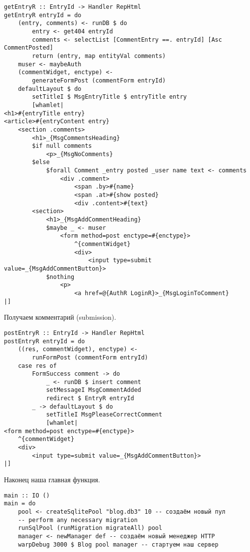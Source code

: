 \begin{lstlisting}
getEntryR :: EntryId -> Handler RepHtml
getEntryR entryId = do
    (entry, comments) <- runDB $ do
        entry <- get404 entryId
        comments <- selectList [CommentEntry ==. entryId] [Asc CommentPosted]
        return (entry, map entityVal comments)
    muser <- maybeAuth
    (commentWidget, enctype) <-
        generateFormPost (commentForm entryId)
    defaultLayout $ do
        setTitleI $ MsgEntryTitle $ entryTitle entry
        [whamlet|
<h1>#{entryTitle entry}
<article>#{entryContent entry}
    <section .comments>
        <h1>_{MsgCommentsHeading}
        $if null comments
            <p>_{MsgNoComments}
        $else
            $forall Comment _entry posted _user name text <- comments
                <div .comment>
                    <span .by>#{name}
                    <span .at>#{show posted}
                    <div .content>#{text}
        <section>
            <h1>_{MsgAddCommentHeading}
            $maybe _ <- muser
                <form method=post enctype=#{enctype}>
                    ^{commentWidget}
                    <div>
                        <input type=submit value=_{MsgAddCommentButton}>
            $nothing
                <p>
                    <a href=@{AuthR LoginR}>_{MsgLoginToComment}
|]
\end{lstlisting}
 
Получаем комментарий (submission). 
 
\begin{lstlisting}
postEntryR :: EntryId -> Handler RepHtml
postEntryR entryId = do
    ((res, commentWidget), enctype) <-
        runFormPost (commentForm entryId)
    case res of
        FormSuccess comment -> do
            _ <- runDB $ insert comment
            setMessageI MsgCommentAdded
            redirect $ EntryR entryId
        _ -> defaultLayout $ do
            setTitleI MsgPleaseCorrectComment
            [whamlet|
<form method=post enctype=#{enctype}>
    ^{commentWidget}
    <div>
        <input type=submit value=_{MsgAddCommentButton}>
|]
\end{lstlisting}
 
Наконец наша главная функция. 
 
\begin{lstlisting}
main :: IO ()
main = do
    pool <- createSqlitePool "blog.db3" 10 -- создаём новый пул
    -- perform any necessary migration
    runSqlPool (runMigration migrateAll) pool
    manager <- newManager def -- создаём новый менеджер HTTP
    warpDebug 3000 $ Blog pool manager -- стартуем наш сервер
\end{lstlisting}